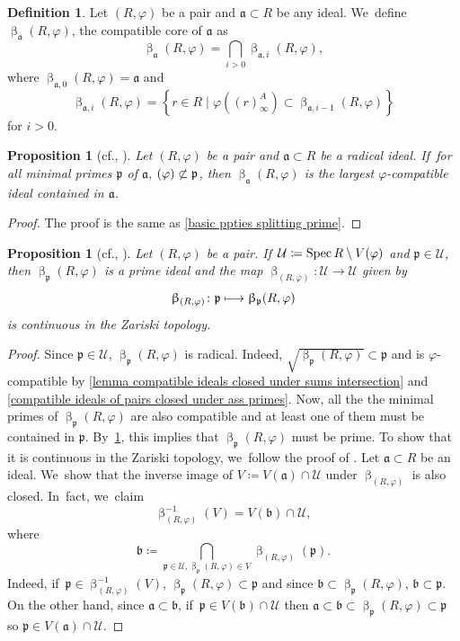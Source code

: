 \documentclass[11pt]{article}
\newcommand{\cf}{cf.\xspace}
\let\autoref\cref
\newcommand\mto{\mathchoice{\longmapsto}{\mapsto}{\mapsto}{\mapsto}}
\theoremstyle{plain}
\newtheorem{proposition}[theorem]{Proposition}
\theoremstyle{definition}
\newtheorem{definition}[theorem]{Definition}
\numberwithin{equation}{theorem}
\newcommand{\fra}{\mathfrak{a}}
\newcommand{\frab}{\mathfrak{b}}
\newcommand{\p}{\mathfrak{p}}
\let\Im\relax
\DeclareMathOperator{\Im}{Im}
\DeclareMathOperator{\Spec}{{Spec}}
\newcommand{\nsubset}{\not\subset}
\newcommand{\sU}{\mathcal{U}}
\renewcommand{\phi}{\varphi}
\newcommand{\rphi}{(R,\phi)}
\newcommand{\inv}{^{-1}}
\begin{document}
\begin{definition}
Let $\rphi$ be a pair and $\fra\subset R$ be any ideal. We~define $\upbeta_\fra\rphi$, the compatible core of $\fra$ as
\[
\upbeta_\fra\rphi=\bigcap_{i>0}\upbeta_{\fra,i}\rphi,
\]
where $\upbeta_{\fra,0}\rphi=\fra$ and
\[
\upbeta_{\fra,i}\rphi=\left\{r\in R\mid \phi\left((r)^A_\infty\right)\subset \upbeta_{\fra,i-1}\rphi\right\}
\]
for $i>0$.
\end{definition}

\begin{proposition}[{\cf \cite[Cor.\,3.14]{BrosowskyCartierCoreMap}, \cite[Prop.\,4.5]{CarvajalFayolleTameRamificationCFPS}}]\label{basic ppties compatible core}
Let $\rphi$ be a pair and $\fra\subset R$ be a radical ideal. If~for all minimal primes $\p$ of $\fra$, $\Im(\phi)\nsubset \p$, then
$\upbeta_\fra\rphi$ is the largest $\phi$-compatible ideal contained in $\fra$.
\end{proposition}

\begin{proof}
The proof is the same as \autoref{basic ppties splitting prime}.
\end{proof}

\begin{proposition}[{\cf \cite[Th.\,3.3]{BrosowskyCartierCoreMap}, \cite[Prop.\,4.14]{CarvajalFayolleTameRamificationCFPS}}]\label{compatible core as a map}
Let $\rphi$ be a pair. If~$\sU\coloneqq\Spec R\setminus V(\Im\phi)$ and $\p\in \sU$, then $\upbeta_\p\rphi$ is a prime ideal and the map $\upbeta_{\rphi}\colon \sU \to \sU$ given by
\[
\upbeta_{\rphi}\colon \p \mto \upbeta_\p\rphi
\]
is continuous in the Zariski topology.
\end{proposition}

\begin{proof}
Since $\p\in \sU$, $\upbeta_\p\rphi$ is radical. Indeed, $\sqrt{\upbeta_\p\rphi}\subset \p$ and is $\phi$-compatible by \autoref{lemma compatible ideals closed under sums intersection} and \autoref{compatible ideals of pairs closed under ass primes}. Now, all the the minimal primes of $\upbeta_\p\rphi$ are also compatible and at least one of them must be contained in $\p$. By~\autoref{basic ppties compatible core}, this implies that $\upbeta_\p\rphi$ must be prime. To show that it is continuous in the Zariski topology, we~follow the proof of \cite[Th.\,3.23]{BrosowskyCartierCoreMap}. Let $\fra\subset R$ be an ideal. We~show that the inverse image of $V\coloneqq V(\fra)\cap \sU$ under $\upbeta_{\rphi}$ is also closed. In~fact, we~claim
\[
\upbeta_{\rphi}\inv(V)= V(\frab)\cap \sU,
\]
where
\[
\frab\coloneqq \bigcap_{\p\in \sU,\upbeta_\p\rphi\in V} \upbeta_{\rphi}(\p).
\]
Indeed, if~$\p\in \upbeta_{\rphi}\inv(V)$, $\upbeta_\p\rphi\subset \p$ and since $\frab\subset \upbeta_\p\rphi$, $\frab\subset \p$. On the other hand, since $\fra\subset\frab$, if~$\p\in V(\frab)\cap \sU$ then $\fra\subset\frab\subset \upbeta_\p\rphi\subset \p$ so $\p\in V(\fra)\cap \sU$.
\end{proof}
\end{document}
